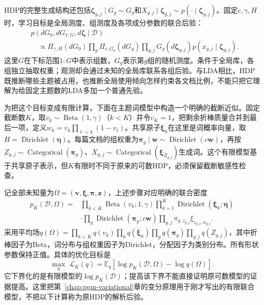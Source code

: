 HDP的完整生成结构还包括$\bm\zeta_{g,j}\mid G_g\sim G_g$和$X_{g,j}\mid\bm\zeta_{g,j}\sim p(\cdot\mid\bm\zeta_{g,j})$。固定$c,\gamma,H$时，学习目标是全局测度、组测度及各项成分参数的联合后验：
\begin{equation}
 \begin{aligned}
 &p(dG_0,dG_{1:G},d\bm\zeta\mid\mathcal D)\\
 &\quad\propto\Pi_{\gamma,H}(dG_0)
     \prod_g\Pi_{c,G_0}(dG_g)
     \prod_{g,j}G_g(d\bm\zeta_{g,j})p(x_{g,j}\mid\bm\zeta_{g,j}).
 \end{aligned}
 \label{eq:pgm-static-directed-hdp-posterior}
\end{equation}
这里$G$在下标范围$1{:}G$中表示组数，$G_g$表示第$g$组的随机测度。条件于全局库，各组独立抽取权重；观测却会通过未知的全局库联系各组后验。与LDA相比，HDP既推断哪些主题被占用，也推断全局使用倾向怎样约束各文档比例，不能只把它理解为给固定主题数的LDA多加一个普通先验。

为把这个目标变成有限计算，下面在主题词模型中构造一个明确的截断近似。固定截断数$K$，取$v_k\sim\operatorname{Beta}(1,\gamma)$（$k<K$）并令$v_K=1$，把剩余折棒质量合并到最后一项，定义$w_k=v_k\prod_{\ell<k}(1-v_\ell)$。共享原子$\bm\xi_k$在这里是词概率向量，取$H=\operatorname{Dirichlet}(\bm\eta)$。每篇文档的组权重为$\bm\pi_g\mid\bm w\sim\operatorname{Dirichlet}(c\bm w)$，再按$Z_{g,j}\sim\operatorname{Categorical}(\bm\pi_g)$、$X_{g,j}\sim\operatorname{Categorical}(\bm\xi_{Z_{g,j}})$生成词。这个有限模型基于共享原子表示，但$K$有限时不同于原来的可数HDP，必须保留截断敏感性检查。

记全部未知量为$\Omega=(\bm v,\bm\xi,\bm\pi,\bm z)$，上述步骤对应明确的联合密度
\begin{equation}
 \begin{aligned}
 p_K(\mathcal D,\Omega)
 ={}&\prod_{k<K}\operatorname{Beta}(v_k;1,\gamma)
       \prod_{k=1}^K\operatorname{Dirichlet}(\bm\xi_k;\bm\eta)\\
 &\cdot\prod_g\operatorname{Dirichlet}(\bm\pi_g;c\bm w)
       \prod_{g,j}\pi_{g,z_{g,j}}\xi_{z_{g,j},x_{g,j}}.
 \end{aligned}
 \label{eq:pgm-static-directed-hdp-truncated-joint}
\end{equation}
采用平均场$q(\Omega)=\prod_{k<K}q(v_k)\prod_kq(\bm\xi_k)\prod_gq(\bm\pi_g)\prod_{g,j}q(Z_{g,j})$，其中折棒因子为Beta，词分布与组权重因子为Dirichlet，分配因子为类别分布。所有形状参数保持正值。具体的优化目标是
\begin{equation}
 \max_q\;\mathcal L_K(q)
   =\mathbb E_q[\log p_K(\mathcal D,\Omega)-\log q(\Omega)].
 \label{eq:pgm-static-directed-hdp-elbo}
\end{equation}
它下界化的是有限模型的$\log p_K(\mathcal D)$；提高该下界不能直接证明原可数模型的证据提高。这里把第~\ref{chap:pgm-variational}章的变分原理用于刚才写出的有限联合模型，不把以下计算称为原HDP的解析后验。


